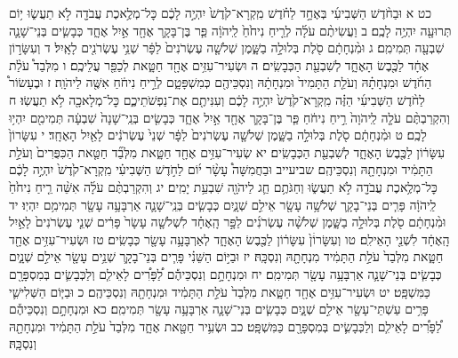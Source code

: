 \documentclass[twoside, openany, parskip=half, 11pt]{book}
\begin{document}
כט א וּבַחֹ֨דֶשׁ הַשְּׁבִיעִ֜י בְּאֶחָ֣ד לַחֹ֗דֶשׁ מִֽקְרָא־קֹ֙דֶשׁ֙ יִהְיֶ֣ה לָכֶ֔ם כׇּל־מְלֶ֥אכֶת עֲבֹדָ֖ה לֹ֣א תַעֲשׂ֑וּ י֥וֹם תְּרוּעָ֖ה יִהְיֶ֥ה לָכֶֽם׃ ב וַעֲשִׂיתֶ֨ם עֹלָ֜ה לְרֵ֤יחַ נִיחֹ֙חַ֙ לַֽיהֹוָ֔ה פַּ֧ר בֶּן־בָּקָ֛ר אֶחָ֖ד אַ֣יִל אֶחָ֑ד כְּבָשִׂ֧ים בְּנֵי־שָׁנָ֛ה שִׁבְעָ֖ה תְּמִימִֽם׃ ג וּמִ֨נְחָתָ֔ם סֹ֖לֶת בְּלוּלָ֣ה בַשָּׁ֑מֶן שְׁלֹשָׁ֤ה עֶשְׂרֹנִים֙ לַפָּ֔ר שְׁנֵ֥י עֶשְׂרֹנִ֖ים לָאָֽיִל׃ ד וְעִשָּׂר֣וֹן אֶחָ֔ד לַכֶּ֖בֶשׂ הָאֶחָ֑ד לְשִׁבְעַ֖ת הַכְּבָשִֽׂים׃ ה וּשְׂעִיר־עִזִּ֥ים אֶחָ֖ד חַטָּ֑את לְכַפֵּ֖ר עֲלֵיכֶֽם׃ ו מִלְּבַד֩ עֹלַ֨ת הַחֹ֜דֶשׁ וּמִנְחָתָ֗הּ וְעֹלַ֤ת הַתָּמִיד֙ וּמִנְחָתָ֔הּ וְנִסְכֵּיהֶ֖ם כְּמִשְׁפָּטָ֑ם לְרֵ֣יחַ נִיחֹ֔חַ אִשֶּׁ֖ה לַיהֹוָֽה׃
ז וּבֶעָשׂוֹר֩ לַחֹ֨דֶשׁ הַשְּׁבִיעִ֜י הַזֶּ֗ה מִֽקְרָא־קֹ֙דֶשׁ֙ יִהְיֶ֣ה לָכֶ֔ם וְעִנִּיתֶ֖ם אֶת־נַפְשֹׁתֵיכֶ֑ם כׇּל־מְלָאכָ֖ה לֹ֥א תַעֲשֽׂוּ׃ ח וְהִקְרַבְתֶּ֨ם עֹלָ֤ה לַֽיהֹוָה֙ רֵ֣יחַ נִיחֹ֔חַ פַּ֧ר בֶּן־בָּקָ֛ר אֶחָ֖ד אַ֣יִל אֶחָ֑ד כְּבָשִׂ֤ים בְּנֵֽי־שָׁנָה֙ שִׁבְעָ֔ה תְּמִימִ֖ם יִהְי֥וּ לָכֶֽם׃ ט וּמִ֨נְחָתָ֔ם סֹ֖לֶת בְּלוּלָ֣ה בַשָּׁ֑מֶן שְׁלֹשָׁ֤ה עֶשְׂרֹנִים֙ לַפָּ֔ר שְׁנֵי֙ עֶשְׂרֹנִ֔ים לָאַ֖יִל הָאֶחָֽד׃ י עִשָּׂרוֹן֙ עִשָּׂר֔וֹן לַכֶּ֖בֶשׂ הָאֶחָ֑ד לְשִׁבְעַ֖ת הַכְּבָשִֽׂים׃ יא שְׂעִיר־עִזִּ֥ים אֶחָ֖ד חַטָּ֑את מִלְּבַ֞ד חַטַּ֤את הַכִּפֻּרִים֙ וְעֹלַ֣ת הַתָּמִ֔יד וּמִנְחָתָ֖הּ וְנִסְכֵּיהֶֽם׃
שביעייב וּבַחֲמִשָּׁה֩ עָשָׂ֨ר י֜וֹם לַחֹ֣דֶשׁ הַשְּׁבִיעִ֗י מִֽקְרָא־קֹ֙דֶשׁ֙ יִהְיֶ֣ה לָכֶ֔ם כׇּל־מְלֶ֥אכֶת עֲבֹדָ֖ה לֹ֣א תַעֲשׂ֑וּ וְחַגֹּתֶ֥ם חַ֛ג לַיהֹוָ֖ה שִׁבְעַ֥ת יָמִֽים׃ יג וְהִקְרַבְתֶּ֨ם עֹלָ֜ה אִשֵּׁ֨ה רֵ֤יחַ נִיחֹ֙חַ֙ לַֽיהֹוָ֔ה פָּרִ֧ים בְּנֵי־בָקָ֛ר שְׁלֹשָׁ֥ה עָשָׂ֖ר אֵילִ֣ם שְׁנָ֑יִם כְּבָשִׂ֧ים בְּנֵֽי־שָׁנָ֛ה אַרְבָּעָ֥ה עָשָׂ֖ר תְּמִימִ֥ם יִהְיֽוּ׃ יד וּמִ֨נְחָתָ֔ם סֹ֖לֶת בְּלוּלָ֣ה בַשָּׁ֑מֶן שְׁלֹשָׁ֨ה עֶשְׂרֹנִ֜ים לַפָּ֣ר הָֽאֶחָ֗ד לִשְׁלֹשָׁ֤ה עָשָׂר֙ פָּרִ֔ים שְׁנֵ֤י עֶשְׂרֹנִים֙ לָאַ֣יִל הָֽאֶחָ֔ד לִשְׁנֵ֖י הָאֵילִֽם׃ טו וְעִשָּׂרוֹׄן֙ עִשָּׂר֔וֹן לַכֶּ֖בֶשׂ הָאֶחָ֑ד לְאַרְבָּעָ֥ה עָשָׂ֖ר כְּבָשִֽׂים׃ טז וּשְׂעִיר־עִזִּ֥ים אֶחָ֖ד חַטָּ֑את מִלְּבַד֙ עֹלַ֣ת הַתָּמִ֔יד מִנְחָתָ֖הּ וְנִסְכָּֽהּ׃
יז וּבַיּ֣וֹם הַשֵּׁנִ֗י פָּרִ֧ים בְּנֵי־בָקָ֛ר שְׁנֵ֥ים עָשָׂ֖ר אֵילִ֣ם שְׁנָ֑יִם כְּבָשִׂ֧ים בְּנֵי־שָׁנָ֛ה אַרְבָּעָ֥ה עָשָׂ֖ר תְּמִימִֽם׃ יח וּמִנְחָתָ֣ם וְנִסְכֵּיהֶ֡ם לַ֠פָּרִ֠ים לָאֵילִ֧ם וְלַכְּבָשִׂ֛ים בְּמִסְפָּרָ֖ם כַּמִּשְׁפָּֽט׃ יט וּשְׂעִיר־עִזִּ֥ים אֶחָ֖ד חַטָּ֑את מִלְּבַד֙ עֹלַ֣ת הַתָּמִ֔יד וּמִנְחָתָ֖הּ וְנִסְכֵּיהֶֽם׃
כ וּבַיּ֧וֹם הַשְּׁלִישִׁ֛י פָּרִ֥ים עַשְׁתֵּי־עָשָׂ֖ר אֵילִ֣ם שְׁנָ֑יִם כְּבָשִׂ֧ים בְּנֵי־שָׁנָ֛ה אַרְבָּעָ֥ה עָשָׂ֖ר תְּמִימִֽם׃ כא וּמִנְחָתָ֣ם וְנִסְכֵּיהֶ֡ם לַ֠פָּרִ֠ים לָאֵילִ֧ם וְלַכְּבָשִׂ֛ים בְּמִסְפָּרָ֖ם כַּמִּשְׁפָּֽט׃ כב וּשְׂעִ֥יר חַטָּ֖את אֶחָ֑ד מִלְּבַד֙ עֹלַ֣ת הַתָּמִ֔יד וּמִנְחָתָ֖הּ וְנִסְכָּֽהּ׃
\end{document}
